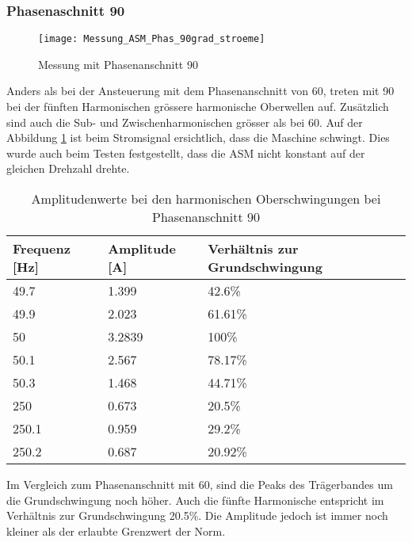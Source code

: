 \subsubsection*{Phasenaschnitt 90\textdegree}
\begin{figure}[ht!]
	\centering
	\texttt{[image: Messung\_ASM\_Phas\_90grad\_stroeme]}	
	\caption{Messung mit Phasenanschnitt 90\textdegree}\label{fig:Mess_Phas_90grad_stroeme}
\end{figure}
Anders als bei der Ansteuerung mit dem Phasenanschnitt von 60\textdegree, treten mit 90\textdegree \hspace{0.02cm} bei der fünften Harmonischen grössere harmonische Oberwellen auf. Zusätzlich sind auch die Sub- und Zwischenharmonischen grösser als bei 60\textdegree. Auf der Abbildung \ref{fig:Mess_Phas_90grad_stroeme} ist beim Stromsignal ersichtlich, dass die Maschine schwingt. Dies wurde auch beim Testen festgestellt, dass die ASM nicht konstant auf der gleichen Drehzahl drehte.  
\begin{table}[ht!]
	\centering
	\begin{tabular}{|l|l|l|}
		\hline
		Frequenz {[}Hz{]} & Amplitude {[}A{]} & Verhältnis zur Grundschwingung	\\ \hline
		49.7              & 1.399             & 42.6\%							\\ \hline
		49.9              & 2.023             & 61.61\%							\\ \hline
		50                & 3.2839            & 100\%							\\ \hline
		50.1              & 2.567             & 78.17\%							\\ \hline
		50.3              & 1.468             & 44.71\%							\\ \hline
		250               & 0.673             & 20.5\%							\\ \hline
		250.1             & 0.959             & 29.2\%							\\ \hline
		250.2             & 0.687             & 20.92\%							\\ \hline
	\end{tabular}
	\caption{Amplitudenwerte bei den harmonischen Oberschwingungen bei Phasenanschnitt 90\textdegree}\label{tab:Phas_90_ASM_stroeme}
\end{table}

Im Vergleich zum Phasenanschnitt mit 60\textdegree, sind die Peaks des Trägerbandes um die Grundschwingung noch höher. Auch die fünfte Harmonische entspricht im Verhältnis zur Grundschwingung 20.5\%. Die Amplitude jedoch ist immer noch kleiner als der erlaubte Grenzwert der Norm. 


